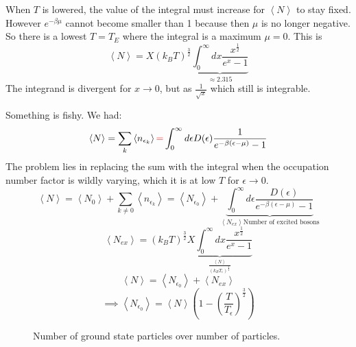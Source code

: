 \documentclass[11pt]{book}
\theoremstyle{definition}
\begin{document}
When $ T $ is lowered, the value of the integral must increase for $ \left \langle N \right \rangle $ to stay fixed. However $ e^{-\beta \mu} $ cannot become smaller than 1 because then $ \mu $ is no longer negative. \\
So there is a lowest $ T = T_E $ where the integral is a maximum $ \mu = 0$.
This is
\[ \left \langle N \right \rangle = X (k_BT)^{\frac{3}{2}} 
\underbrace{\int_0^{\infty} dx \frac{x^{\frac{1}{2}}}{e^{x}-1}}_{\approx 2.315} \] 
The integrand is divergent for $ x \to 0 $, but as $ \frac{1}{\sqrt{x}} $ which still is integrable.

Something is fishy. We had:
\[ \left \langle N \right \rangle = \sum_k \left \langle n_{ \epsilon_k } \right \rangle {\color{red} = } \int_{0}^{\infty} d \epsilon D(\epsilon) \frac{1}{e^{-\beta(\epsilon-\mu)}-1} \] 
The problem lies in replacing the sum with the integral when the occupation number factor is wildly varying, which it is at low $ T $ for $ \epsilon \to 0 $.
\[ \left \langle N \right \rangle = \left \langle N_0 \right \rangle + \sum_{k \neq 0} \left \langle n_{\epsilon_k} \right \rangle = \left \langle N_{\epsilon_0} \right \rangle +
\underbrace{\int_{0}^{\infty} d\epsilon \frac{D(\epsilon)}{e^{-\beta(\epsilon-\mu)}-1}}_{\left \langle N_{ex} \right \rangle \text{Number of excited bosons}} \] 
\[ \left \langle N_{ex} \right \rangle = (k_BT)^{\frac{3}{2}} 
\underbrace{X\int_{0}^{\infty} dx \frac{x^{\frac{1}{2}}}{e^{x}-1}}_{\frac{\left \langle N \right \rangle }{(k_BT_{\epsilon})^{\frac{3}{2}}}}  \] 
\[ \left \langle N \right \rangle = \left \langle N_{\epsilon_0} \right \rangle + \left \langle N_{ex} \right \rangle  \] 
\[ \implies \left \langle N_{\epsilon_0} \right \rangle = \left \langle N \right \rangle \left( 1-(\frac{T}{T_\epsilon})^{\frac{3}{2}} \right)  \] 
\begin{figure}[htpb]
\begin{center}
\end{center}
\caption{Number of ground state particles over number of particles.}%
\label{fig:bec}
\end{figure}
\end{document}
